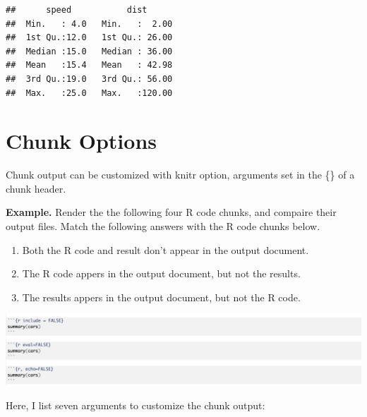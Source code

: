 \documentclass[]{article}
\providecommand{\tightlist}{%
  \setlength{\itemsep}{0pt}\setlength{\parskip}{0pt}}
\begin{document}
\begin{verbatim}
##      speed           dist       
##  Min.   : 4.0   Min.   :  2.00  
##  1st Qu.:12.0   1st Qu.: 26.00  
##  Median :15.0   Median : 36.00  
##  Mean   :15.4   Mean   : 42.98  
##  3rd Qu.:19.0   3rd Qu.: 56.00  
##  Max.   :25.0   Max.   :120.00
\end{verbatim}

\hypertarget{chunk-options}{%
\section{Chunk Options}\label{chunk-options}}

Chunk output can be customized with knitr option, arguments set in the
\{\} of a chunk header.

\textbf{Example.} Render the the following four R code chunks, and
compaire their output files. Match the following answers with the R code
chunks below.

\begin{enumerate}
\def\labelenumi{\arabic{enumi}.}
\tightlist
\item
  Both the R code and result don't appear in the output document.\\
\item
  The R code appers in the output document, but not the results.\\
\item
  The results appers in the output document, but not the R code.
\end{enumerate}

\includegraphics{picture2.png}

Here, I list seven arguments to customize the chunk output:
\end{document}
